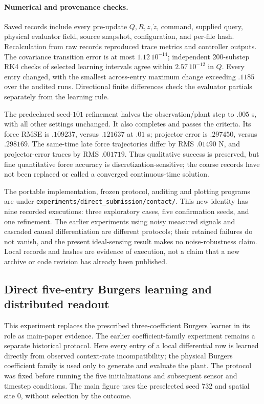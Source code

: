\documentclass[journal]{IEEEtran}
\begin{document}
\paragraph{Numerical and provenance checks.}
Saved records include every pre-update $Q,R,z,\dot z$, command, supplied query,
physical evaluator field, source snapshot, configuration, and per-file hash.
Recalculation from raw records reproduced trace metrics and controller outputs.
The covariance transition error is at most $1.12\,10^{-14}$; independent
200-substep RK4 checks of selected learning intervals agree within
$2.57\,10^{-12}$ in $Q$. Every entry changed, with the smallest across-entry
maximum change exceeding $.1185$ over the audited runs. Directional finite
differences check the evaluator partials separately from the learning rule.

The predeclared seed-$101$ refinement halves the observation/plant step to
$.005$ s, with all other settings unchanged. It also completes and passes the
criteria. Its force RMSE is $.109237$, versus $.121637$ at $.01$ s; projector
error is $.297450$, versus $.298169$. The same-time late force trajectories
differ by RMS $.01490$ N, and projector-error traces by RMS $.001719$.
Thus qualitative success is preserved, but fine quantitative force accuracy
is discretization-sensitive; the coarse records have not been replaced or
called a converged continuous-time solution.

The portable implementation, frozen protocol, auditing and plotting programs
are under \texttt{experiments/direct\_submission/contact/}. This new identity
has nine recorded executions: three exploratory cases, five confirmation
seeds, and one refinement. The earlier experiments using noisy measured
signals and cascaded causal differentiation are different protocols; their
retained failures do not vanish, and the present ideal-sensing result makes
no noise-robustness claim. Local records and hashes are evidence of execution,
not a claim that a new archive or code revision has already been published.
%
\subsection{Direct five-entry Burgers learning and distributed readout}
\label{sec:direct_burgers_protocol}

This experiment replaces the prescribed three-coefficient Burgers learner in
its role as main-paper evidence. The earlier coefficient-family experiment
remains a separate historical protocol. Here every entry of a local differential
row is learned directly from observed context-rate incompatibility; the physical
Burgers coefficient family is used only to generate and evaluate the plant.
The protocol was fixed before running the five initializations and subsequent
sensor and timestep conditions. The main figure uses the preselected seed 732
and spatial site 0, without selection by the outcome.
\end{document}
